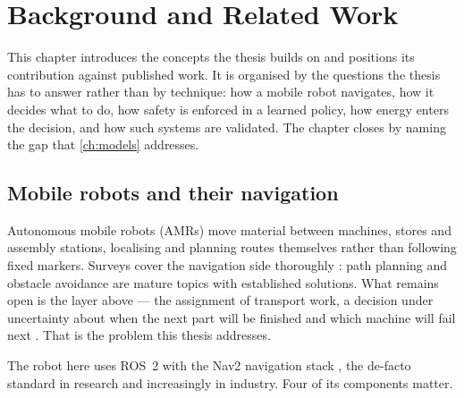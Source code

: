 
\chapter{Background and Related Work}
\label{ch:background}

This chapter introduces the concepts the thesis builds on and positions its contribution against
published work. It is organised by the questions the thesis has to answer rather than by
technique: how a mobile robot navigates, how it decides what to do, how safety is enforced in a
learned policy, how energy enters the decision, and how such systems are validated. The chapter
closes by naming the gap that \cref{ch:models} addresses.

\section{Mobile robots and their navigation}
\label{sec:nav2}

Autonomous mobile robots (AMRs) move material between machines, stores and assembly stations,
localising and planning routes themselves rather than following fixed markers. Surveys cover the
navigation side thoroughly \cite{tang2025pathplanningreview, katona2024obstacleavoidance,
aremu2025pathplanningreview}: path planning and obstacle avoidance are mature topics with
established solutions. What remains open is the layer above --- the assignment of transport work,
a decision under uncertainty about when the next part will be finished and which machine will fail
next \cite{warita2024onlineplanning}. That is the problem this thesis addresses.

The robot here uses ROS~2 \cite{macenski2022ros2} with the Nav2 navigation stack
\cite{macenski2020nav2}, the de-facto standard in research and increasingly in industry. Four of
its components matter.

